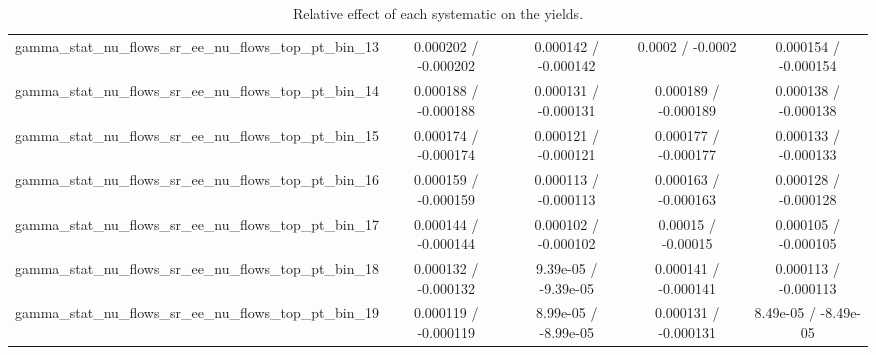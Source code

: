 \documentclass[10pt]{article}
\begin{document}
\begin{table}[htbp]
\begin{center}
\begin{tabular}{|c|c|c|c|c|}
  gamma_stat_nu_flows_sr_ee_nu_flows_top_pt_bin_13 & 0.000202 / -0.000202 & 0.000142 / -0.000142 & 0.0002 / -0.0002 & 0.000154 / -0.000154 \\ 
  gamma_stat_nu_flows_sr_ee_nu_flows_top_pt_bin_14 & 0.000188 / -0.000188 & 0.000131 / -0.000131 & 0.000189 / -0.000189 & 0.000138 / -0.000138 \\ 
  gamma_stat_nu_flows_sr_ee_nu_flows_top_pt_bin_15 & 0.000174 / -0.000174 & 0.000121 / -0.000121 & 0.000177 / -0.000177 & 0.000133 / -0.000133 \\ 
  gamma_stat_nu_flows_sr_ee_nu_flows_top_pt_bin_16 & 0.000159 / -0.000159 & 0.000113 / -0.000113 & 0.000163 / -0.000163 & 0.000128 / -0.000128 \\ 
  gamma_stat_nu_flows_sr_ee_nu_flows_top_pt_bin_17 & 0.000144 / -0.000144 & 0.000102 / -0.000102 & 0.00015 / -0.00015 & 0.000105 / -0.000105 \\ 
  gamma_stat_nu_flows_sr_ee_nu_flows_top_pt_bin_18 & 0.000132 / -0.000132 & 9.39e-05 / -9.39e-05 & 0.000141 / -0.000141 & 0.000113 / -0.000113 \\ 
  gamma_stat_nu_flows_sr_ee_nu_flows_top_pt_bin_19 & 0.000119 / -0.000119 & 8.99e-05 / -8.99e-05 & 0.000131 / -0.000131 & 8.49e-05 / -8.49e-05 \\ 
\hline 
\end{tabular} 
\caption{Relative effect of each systematic on the yields.} 
\end{center} 
\end{table} 
\end{document}
